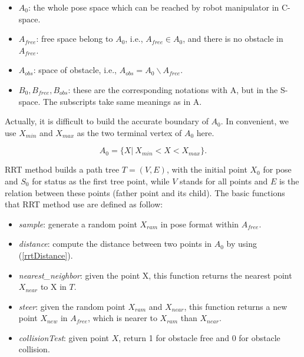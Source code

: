 \documentclass[letterpaper, 10 pt, conference]{ieeeconf}  %
\begin{document}
\begin{itemize}

\item $A_{0}$: the whole pose space which can be reached by robot manipulator in C-space. 

\item $A_{free}$: free space belong to $A_{0}$, i.e., $A_{free} \in A_{0}$, and there is no obstacle in $A_{free}$.

\item $A_{obs}$: space of obstacle, i.e., $A_{obs} = A_{0}  \backslash A_{free}$.

\item $B_{0}, B_{free}, B_{obs}$: these are the corresponding notations with A, but in the S-space. The subscripts take same meanings as in A.

\end{itemize}

Actually, it is difficult to build the accurate boundary of $A_{0}$. In convenient, we use $X_{min}$ and $X_{max}$ as the two terminal vertex of $A_{0}$ here.

\begin{equation}
A_{0} = \{X|\ X_{min} < X < X_{max}\}.
\label{eq_a0}
\end{equation}

RRT method builds a path tree $T = (V, E)$, with the initial point $X_{0}$ for pose and $S_{0}$ for status as the first tree point, while $V$ stands for all points and $E$ is the relation between these points (father point and its child). The basic functions that RRT method use are defined as follow:

\begin{itemize}

\item \textit{sample}:  generate a random point $X_{ram}$ in pose format within $A_{free}$.

\item \textit{distance}:  compute the distance between two points in $A_{0}$ by using (\ref{rrtDistance}).

\item \textit{nearest\_neighbor}: given the point X, this function returns the nearest point $X_{near}$ to X in $T$.

\item \textit{steer}: given the random point $X_{ram}$ and $X_{near}$, this function returns a new point $X_{new}$ in $A_{free}$, which is nearer to $X_{ram}$ than $X_{near}$.

\item \textit{collisionTest}: given point $X$, return 1 for obstacle free and 0 for obstacle collision.

\end{itemize}
\end{document}
